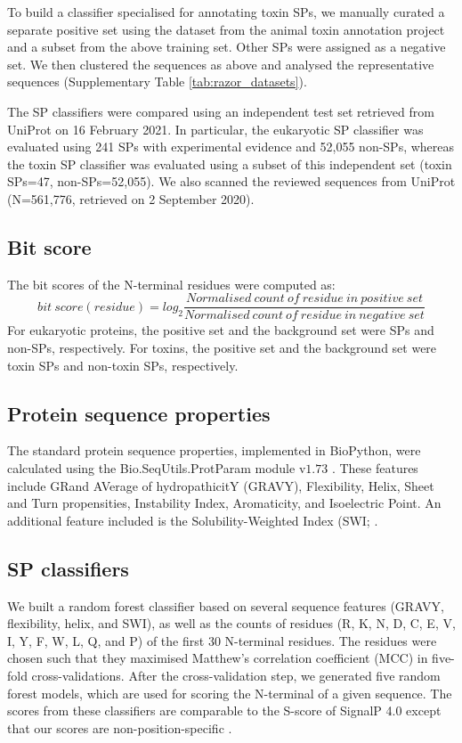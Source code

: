 To build a classifier specialised for annotating toxin SPs, we manually curated a separate positive set using the dataset from the animal toxin annotation project \cite{Jungo2012-ja} and a subset from the above training set. Other SPs were assigned as a negative set. We then clustered the sequences as above and analysed the representative sequences (Supplementary Table \ref{tab:razor_datasets}). 

The SP classifiers were compared using an independent test set retrieved from UniProt on 16 February 2021. In particular, the eukaryotic SP classifier was evaluated using 241 SPs with experimental evidence and 52,055 non-SPs, whereas the toxin SP classifier was evaluated using a subset of this independent set (toxin SPs=47, non-SPs=52,055). We also scanned the reviewed sequences from UniProt (N=561,776, retrieved on 2 September 2020).

\subsection{Bit score}
The bit scores of the N-terminal residues were computed as:
%
\begin{equation}
    bit\ score (residue) = log_2 \frac{Normalised\ count\ of\ residue\ in\ positive\ set}{Normalised\ count\ of\ residue\ in\ negative\ set}
\end{equation}
%
For eukaryotic proteins, the positive set and the background set were SPs and non-SPs, respectively. For toxins, the positive set and the background set were toxin SPs and non-toxin SPs, respectively.


\subsection{Protein sequence properties}
The standard protein sequence properties, implemented in BioPython, were calculated using the Bio.SeqUtils.ProtParam module v$1.73$ \cite{Cock2009-ym}. These features include GRand AVerage of hydropathicitY (GRAVY), Flexibility, Helix, Sheet and Turn propensities, Instability Index, Aromaticity, and Isoelectric Point. An additional feature included is the Solubility-Weighted Index (SWI; \cite{Bhandari2020-pz}.

\subsection{SP classifiers}
We built a random forest classifier based on several sequence features (GRAVY, flexibility, helix, and SWI), as well as the counts of residues (R, K, N, D, C, E, V, I, Y, F, W, L, Q, and P) of the first 30 N-terminal residues. The residues were chosen such that they maximised Matthew's correlation coefficient (MCC) in five-fold cross-validations. After the cross-validation step, we generated five random forest models, which are used for scoring the N-terminal of a given sequence. The scores from these classifiers are comparable to the S-score of SignalP 4.0 except that our scores are non-position-specific \cite{Petersen2011-ex}.

